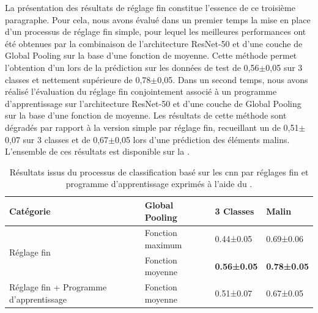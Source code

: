 La présentation des résultats de réglage fin constitue l'essence de ce troisième paragraphe. Pour cela, nous avons évalué dans un premier temps la mise en place d'un processus de réglage fin simple, pour lequel les meilleures performances ont été obtenues par la combinaison de l'architecture ResNet-50 et d'une couche de Global Pooling sur la base d'une fonction de moyenne. Cette méthode permet l'obtention d'un \fscore{} lors de la prédiction sur les données de test de 0,56$\pm$0,05 sur 3 classes et nettement supérieure de 0,78$\pm$0,05. Dans un second temps, nous avons réalisé l'évaluation du réglage fin conjointement associé à un programme d'apprentissage sur l'architecture ResNet-50 et d'une couche de Global Pooling sur la base d'une fonction de moyenne. Les résultats de cette méthode sont dégradés par rapport à la version simple par réglage fin, recueillant un \fscore{} de 0,51$\pm$0,07 sur 3 classes et de 0,67$\pm$0,05 lors d'une prédiction des éléments malins. L'ensemble de ces résultats est disponible sur la .\par

\begin{table}[H]
    \centering
    \begin{tabular}{llll}
        \toprule
        Catégorie                               & Global Pooling    & 3 Classes         & Malin             \\ \midrule
        \multirow{2}{*}{Réglage fin}            & Fonction maximum  & 0.44±0.05         & 0.69±0.06         \\ \cline{2-4}
                                                & Fonction moyenne  & \textbf{0.56±0.05}& \textbf{0.78±0.05}\\ \midrule
        Réglage fin + Programme d'apprentissage & Fonction moyenne  & 0.51±0.07         & 0.67±0.05         \\
        \bottomrule
    \end{tabular}
    
    \caption{Résultats issus du processus de classification basé sur les \gls{cnn} par réglages fin et programme d'apprentissage exprimés à l'aide du \fscore.}
    \label{tab:parameters_image_improvement_fine}
\end{table}

